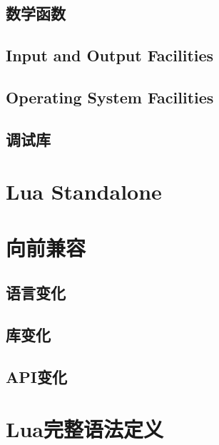 \documentclass{ctexart}
\begin{document}
\subsection{数学函数}

\subsection{Input and Output Facilities}

\subsection{Operating System Facilities}

\subsection{调试库}

\section{Lua Standalone}

\section{向前兼容}

\subsection{语言变化}

\subsection{库变化}

\subsection{API变化}

\section{Lua完整语法定义}
\end{document}
